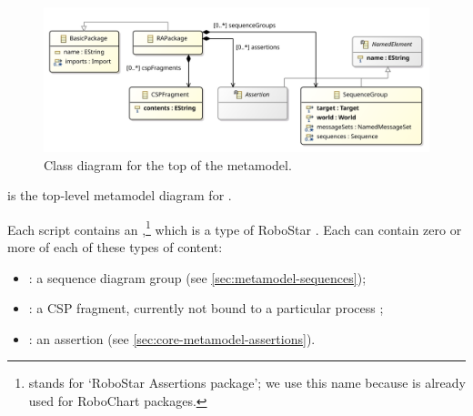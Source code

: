 \begin{figure}[htb]
  \centering
  \includegraphics[width=.85\textwidth]{diagrams/Top}
  \caption{Class diagram for the top of the \langname{} metamodel.}
  \label{fig:metamodel-top}
\end{figure}

 is the top-level metamodel diagram for \langname.

Each \langname{} script contains an \mrapackage,\footnote{\mrapackage{} stands
  for `RoboStar Assertions package'; we use this name because \mrcpackage{} is
  already used for RoboChart packages.}
which is a type of RoboStar \mbasicpackage.
Each \mrapackage{} can contain zero or more of each of these types of content:

\begin{itemize}
\item
  \msequencegroup:
  a sequence diagram group
  (see \cref{sec:metamodel-sequences});
\item
  \mcspfragment:
  a CSP fragment, currently not bound to a particular process
  ;
\item
  \massertion:
  an assertion
  (see \cref{sec:core-metamodel-assertions}).
\end{itemize}

